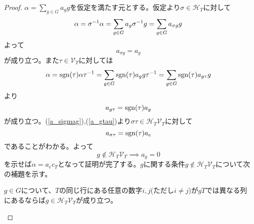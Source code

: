 \documentclass{ltjsreport}
\begin{document}
\begin{proof}
  $\alpha=\sum_{g\in G}a_gg$を仮定を満たす元とする。仮定より$\sigma\in \mathcal{H}_T$に対して
  \[
  \alpha=\sigma^{-1}\alpha=\sum_{g\in G}a_g\sigma^{-1} g=\sum_{g\in G}a_{\sigma g}g
  \]
  よって
  \begin{equation}
    a_{\sigma g}=a_g  \label{a_sigmag}
  \end{equation}
  が成り立つ。また$\tau\in\mathcal{V}_T$に対しては
  \[
  \alpha=\mathrm{sgn}(\tau)\alpha\tau^{-1}=\sum_{g\in G}\mathrm{sgn}(\tau)a_gg\tau^{-1}=\sum_{g\in G}\mathrm{sgn}(\tau)a_{g\tau}{g}
  \]
  より
  \begin{equation}
    a_{g\tau}=\mathrm{sgn}(\tau)a_g  \label{a_gtau}
  \end{equation}
  が成り立つ。(\ref{a_sigmag}),(\ref{a_gtau})より$\sigma\tau\in\mathcal{H}_T\mathcal{V}_T$に対して
  \[
  a_{\sigma\tau}=\mathrm{sgn}(\tau)a_{e}  
  \]
  であることがわかる。よって
  \begin{equation}
  g\notin\mathcal{H}_T\mathcal{V}_T\implies a_g=0 \label{lemm:coefficient_zero} 
  \end{equation}
  を示せば$\alpha=a_ec_T$となって証明が完了する。$g$に関する条件$g\notin\mathcal{H}_T\mathcal{V}_T$について次の補題を示す。
  \begin{lemm}\label{lamm:117}
    $g\in G$について、$T$の同じ行にある任意の数字$i,j$(ただし$i\neq j$)が$gT$では異なる列にあるならば$g\in\mathcal{H}_T\mathcal{V}_T$が成り立つ。
  \end{lemm}


\end{proof}
\end{document}
